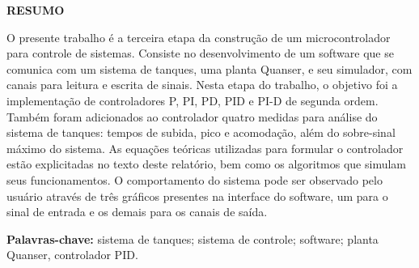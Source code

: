 \documentclass[a4paper,12pt]{article}
\begin{document}
\newpage


\thispagestyle{empty}

\begin{center}
{\large \textbf{RESUMO}}
\end{center}

\vspace{3cm}

\begin{flushleft}

\hspace{4ex}O presente trabalho é a terceira etapa da construção de um microcontrolador para controle de sistemas. Consiste no desenvolvimento de um software que se comunica com um sistema de tanques, uma planta Quanser, e seu simulador, com canais para leitura e escrita de sinais. Nesta etapa do trabalho, o objetivo foi a implementação de controladores P, PI, PD, PID e PI-D de segunda ordem. Também foram adicionados ao controlador quatro medidas para análise do sistema de tanques: tempos de subida, pico e acomodação, além do sobre-sinal máximo do sistema. As equações teóricas utilizadas para formular o controlador estão explicitadas no texto deste relatório, bem como os algoritmos que simulam seus funcionamentos. O comportamento do sistema pode ser observado pelo usuário através de três gráficos presentes na interface do software, um para o sinal de entrada e os demais para os canais de saída.\\

\end{flushleft}

\vspace{1.5cm}

\textbf{Palavras-chave:} sistema de tanques; sistema de controle; software; planta Quanser, controlador PID.

\newpage


\thispagestyle{empty}

\begin{center}
\listoffigures
\end{center}

\newpage


\thispagestyle{empty}

\begin{center}
\tableofcontents
\end{center}
\end{document}
